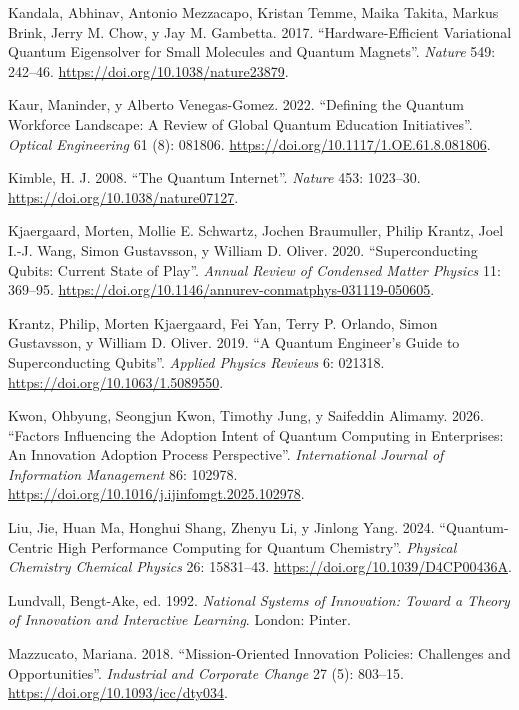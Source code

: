 \documentclass[
  11pt,
  letterpaper,
]{article}
\newlength{\cslhangindent}
\newenvironment{CSLReferences}[2] %
 {\begin{list}{}{%
  \setlength{\itemindent}{0pt}
  \setlength{\leftmargin}{0pt}
  \setlength{\parsep}{0pt}
  \ifodd #1
   \setlength{\leftmargin}{\cslhangindent}
   \setlength{\itemindent}{-1\cslhangindent}
  \fi
  \setlength{\itemsep}{#2\baselineskip}}}
 {\end{list}}
\begin{document}
\begin{CSLReferences}{1}{0}
Kandala, Abhinav, Antonio Mezzacapo, Kristan Temme, Maika Takita, Markus
Brink, Jerry M. Chow, y Jay M. Gambetta. 2017. {``Hardware-Efficient
Variational Quantum Eigensolver for Small Molecules and Quantum
Magnets''}. \emph{Nature} 549: 242--46.
\url{https://doi.org/10.1038/nature23879}.

Kaur, Maninder, y Alberto Venegas-Gomez. 2022. {``Defining the Quantum
Workforce Landscape: A Review of Global Quantum Education
Initiatives''}. \emph{Optical Engineering} 61 (8): 081806.
\url{https://doi.org/10.1117/1.OE.61.8.081806}.

Kimble, H. J. 2008. {``The Quantum Internet''}. \emph{Nature} 453:
1023--30. \url{https://doi.org/10.1038/nature07127}.

Kjaergaard, Morten, Mollie E. Schwartz, Jochen Braumuller, Philip
Krantz, Joel I.-J. Wang, Simon Gustavsson, y William D. Oliver. 2020.
{``Superconducting Qubits: Current State of Play''}. \emph{Annual Review
of Condensed Matter Physics} 11: 369--95.
\url{https://doi.org/10.1146/annurev-conmatphys-031119-050605}.

Krantz, Philip, Morten Kjaergaard, Fei Yan, Terry P. Orlando, Simon
Gustavsson, y William D. Oliver. 2019. {``A Quantum Engineer's Guide to
Superconducting Qubits''}. \emph{Applied Physics Reviews} 6: 021318.
\url{https://doi.org/10.1063/1.5089550}.

Kwon, Ohbyung, Seongjun Kwon, Timothy Jung, y Saifeddin Alimamy. 2026.
{``Factors Influencing the Adoption Intent of Quantum Computing in
Enterprises: An Innovation Adoption Process Perspective''}.
\emph{International Journal of Information Management} 86: 102978.
\url{https://doi.org/10.1016/j.ijinfomgt.2025.102978}.

Liu, Jie, Huan Ma, Honghui Shang, Zhenyu Li, y Jinlong Yang. 2024.
{``Quantum-Centric High Performance Computing for Quantum Chemistry''}.
\emph{Physical Chemistry Chemical Physics} 26: 15831--43.
\url{https://doi.org/10.1039/D4CP00436A}.

Lundvall, Bengt-Ake, ed. 1992. \emph{National Systems of Innovation:
Toward a Theory of Innovation and Interactive Learning}. London: Pinter.

Mazzucato, Mariana. 2018. {``Mission-Oriented Innovation Policies:
Challenges and Opportunities''}. \emph{Industrial and Corporate Change}
27 (5): 803--15. \url{https://doi.org/10.1093/icc/dty034}.


\end{CSLReferences}
\end{document}
